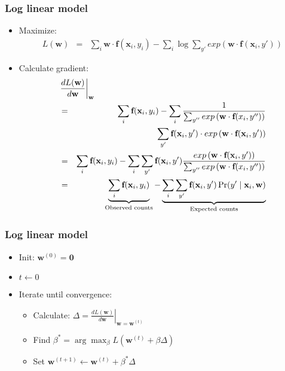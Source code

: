 \begin{frame}
\frametitle{Log linear model}
\begin{itemize}[<+->]
\item Maximize:
\begin{eqnarray*}
L(\textbf{w}) &=& \sum_i \textbf{w} \cdot \textbf{f}(\textbf{x}_i, y_i) - \sum_i \log \sum_{y'} exp\left( \textbf{w} \cdot \textbf{f}(\textbf{x}_i, y') \right) 
\end{eqnarray*}
\item Calculate gradient:
\begin{eqnarray*}
\lefteqn{\left. \frac{d L(\textbf{w})}{d \textbf{w}} \right|_{\textbf{w}} } \\
&=& \sum_i \textbf{f}(\textbf{x}_i, y_i) - \sum_i \frac{1}{\sum_{y''} exp\left(\textbf{w} \cdot \textbf{f}(x_i, y'')\right)} \\
&& \sum_{y'} \textbf{f}(\textbf{x}_i, y')  \cdot exp\left( \textbf{w} \cdot \textbf{f}(\textbf{x}_i, y') \right) \\
&=& \sum_i \textbf{f}(\textbf{x}_i, y_i) - \sum_i \sum_{y'} \textbf{f}(\textbf{x}_i, y') \frac{exp\left( \textbf{w} \cdot \textbf{f}(\textbf{x}_i, y') \right)}{\sum_{y''} exp\left(\textbf{w} \cdot \textbf{f}(x_i, y'')\right)} \\
&=& \underbrace{\sum_i \textbf{f}(\textbf{x}_i, y_i)}_{\textrm{Observed counts}} - \underbrace{\sum_i \sum_{y'} \textbf{f}(\textbf{x}_i, y') \Pr(y' \mid \textbf{x}_i, \textbf{w})}_{\textrm{Expected counts}}
\end{eqnarray*}
\end{itemize}
\end{frame}

\begin{frame}
\frametitle{Log linear model}
\begin{itemize}[<+->]
\item Init: $\textbf{w}^{(0)} = \textbf{0}$
\item $t \leftarrow 0$
\item Iterate until convergence:
\begin{itemize}[<+->]
\item Calculate: $\Delta = \left. \frac{d L(\textbf{w})}{d \textbf{w}}  \right|_{\textbf{w} = \textbf{w}^{(t)}}$
\item Find $\beta^\ast = \arg\max_\beta L(\textbf{w}^{(t)} + \beta \Delta)$
\item Set $\textbf{w}^{(t+1)} \leftarrow \textbf{w}^{(t)} + \beta^\ast \Delta$
\end{itemize}
\end{itemize}
\end{frame}

